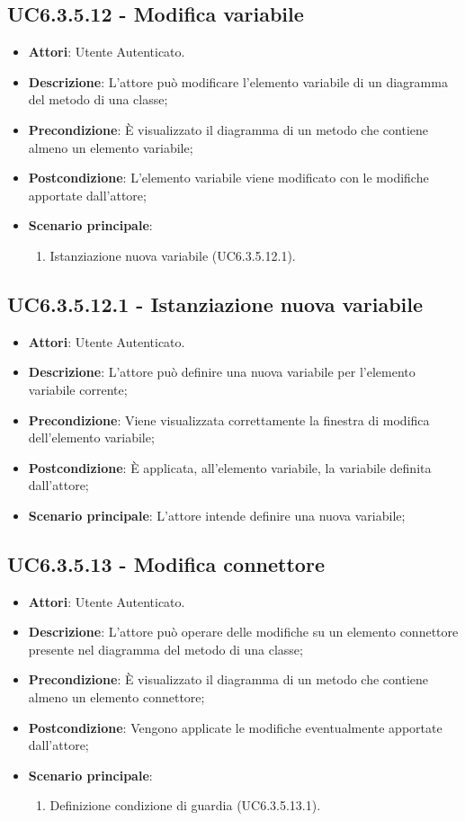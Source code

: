 \subsection{UC6.3.5.12 - Modifica variabile} 
\label{ssec:UC6.3.5.12} 
\begin{itemize} 
\item \textbf{Attori}: Utente Autenticato.
\item \textbf{Descrizione}: L'attore può modificare l'elemento variabile di un diagramma del metodo di una classe;
\item \textbf{Precondizione}: È visualizzato il diagramma di un metodo che contiene almeno un elemento variabile;
\item \textbf{Postcondizione}: L'elemento variabile viene modificato con le modifiche apportate dall'attore;
\item \textbf{Scenario principale}: \begin{enumerate}\item Istanziazione nuova variabile (UC6.3.5.12.1). 
 \end{enumerate}
\end{itemize} 
\subsection{UC6.3.5.12.1 - Istanziazione nuova variabile} 
\label{ssec:UC6.3.5.12.1} 
\begin{itemize} 
\item \textbf{Attori}: Utente Autenticato.
\item \textbf{Descrizione}: L'attore può definire una nuova variabile per l'elemento variabile corrente;
\item \textbf{Precondizione}: Viene visualizzata correttamente la finestra di modifica dell'elemento variabile;
\item \textbf{Postcondizione}: È applicata, all'elemento variabile, la variabile definita dall'attore;
\item \textbf{Scenario principale}: L'attore intende definire una nuova variabile;\end{itemize} 
\subsection{UC6.3.5.13 - Modifica connettore} 
\label{ssec:UC6.3.5.13} 
\begin{itemize} 
\item \textbf{Attori}: Utente Autenticato.
\item \textbf{Descrizione}: L'attore può operare delle modifiche su un elemento connettore presente nel diagramma del metodo di una classe;
\item \textbf{Precondizione}: È visualizzato il diagramma di un metodo che contiene almeno un elemento connettore;
\item \textbf{Postcondizione}: Vengono applicate le modifiche eventualmente apportate dall'attore;
\item \textbf{Scenario principale}: \begin{enumerate}\item Definizione condizione di guardia (UC6.3.5.13.1). 
 \end{enumerate}
\end{itemize} 
